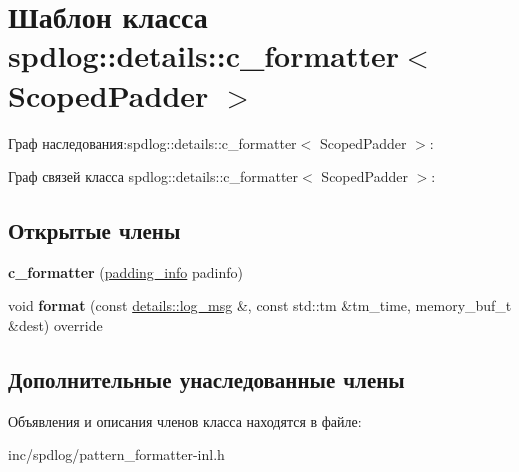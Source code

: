 \hypertarget{classspdlog_1_1details_1_1c__formatter}{}\section{Шаблон класса spdlog\+:\+:details\+:\+:c\+\_\+formatter$<$ Scoped\+Padder $>$}
\label{classspdlog_1_1details_1_1c__formatter}


Граф наследования\+:spdlog\+:\+:details\+:\+:c\+\_\+formatter$<$ Scoped\+Padder $>$\+:


Граф связей класса spdlog\+:\+:details\+:\+:c\+\_\+formatter$<$ Scoped\+Padder $>$\+:
\subsection*{Открытые члены}
\begin{DoxyCompactItemize}
\item 
\mbox{\label{classspdlog_1_1details_1_1c__formatter_a05376d8124476773f809e2e682f66cf1}} 
{\bfseries c\+\_\+formatter} (\hyperlink{structspdlog_1_1details_1_1padding__info}{padding\+\_\+info} padinfo)
\item 
\mbox{\label{classspdlog_1_1details_1_1c__formatter_a6e0ffe10f8dd394d233f2b86ef097185}} 
void {\bfseries format} (const \hyperlink{structspdlog_1_1details_1_1log__msg}{details\+::log\+\_\+msg} \&, const std\+::tm \&tm\+\_\+time, memory\+\_\+buf\+\_\+t \&dest) override
\end{DoxyCompactItemize}
\subsection*{Дополнительные унаследованные члены}


Объявления и описания членов класса находятся в файле\+:\begin{DoxyCompactItemize}
\item 
inc/spdlog/pattern\+\_\+formatter-\/inl.\+h\end{DoxyCompactItemize}
